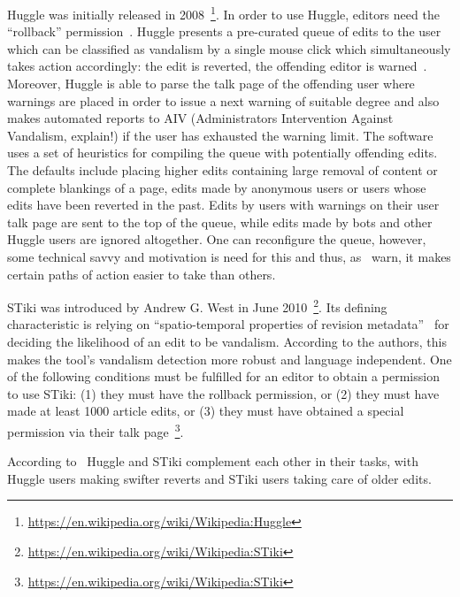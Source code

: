 Huggle was initially released in 2008~\footnote{\url{https://en.wikipedia.org/wiki/Wikipedia:Huggle}}.
In order to use Huggle, editors need the ``rollback'' permission~\cite{HalRied2012}.
Huggle presents a pre-curated queue of edits to the user which can be classified as vandalism by a single mouse click which simultaneously takes action accordingly: the edit is reverted, the offending editor is warned~\cite{HalRied2012}.
Moreover, Huggle is able to parse the talk page of the offending user where warnings are placed in order to issue a next warning of suitable degree and also makes automated reports to AIV (Administrators Intervention Against Vandalism, explain!) if the user has exhausted the warning limit.
The software uses a set of heuristics for compiling the queue with potentially offending edits.
The defaults include placing higher edits containing large removal of content or complete blankings of a page, edits made by anonymous users or users whose edits have been reverted in the past.
Edits by users with warnings on their user talk page are sent to the top of the queue, while edits made by bots and other Huggle users are ignored altogether\cite{GeiRib2010}.
One can reconfigure the queue, however, some technical savvy and motivation is need for this and thus, as~\cite{GeiRib2010} warn, it makes certain paths of action easier to take than others.

STiki was introduced by Andrew G. West in June 2010~\footnote{\url{https://en.wikipedia.org/wiki/Wikipedia:STiki}}.
Its defining characteristic is relying on ``spatio-temporal properties of revision metadata''~\cite{WestKanLee2010} for deciding the likelihood of an edit to be vandalism.
According to the authors, this makes the tool's vandalism detection more robust and language independent.
One of the following conditions must be fulfilled for an editor to obtain a permission to use STiki:
(1) they must have the rollback permission, or
(2) they must have made at least 1000 article edits, or
(3) they must have obtained a special permission via their talk page~\footnote{\url{https://en.wikipedia.org/wiki/Wikipedia:STiki}}.

According to~\cite{GeiHal2013} Huggle and STiki complement each other in their tasks, with Huggle users making swifter reverts and STiki users taking care of older edits.

